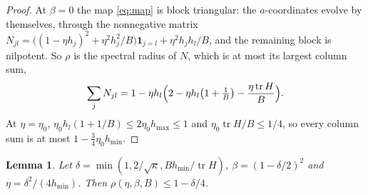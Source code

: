 \documentclass[11pt]{amsart}
\newtheorem{lemma}[theorem]{Lemma}
\theoremstyle{definition}
\theoremstyle{remark}
\numberwithin{equation}{section}
\newcommand{\tr}{\operatorname{tr}}
\newcommand{\hmax}{h_{\max}}
\newcommand{\hmin}{h_{\min}}
\begin{document}
\begin{proof}
At $\beta=0$ the map \eqref{eq:map} is block triangular: the $a$-coordinates evolve by themselves, through the nonnegative matrix $N_{jl}=\bigl((1-\eta h_j)^2+\eta^2h_j^2/B\bigr)\mathbf 1_{j=l}+\eta^2h_jh_l/B$, and the remaining block is nilpotent. So $\rho$ is the spectral radius of $N$, which is at most its largest column sum,
\[
\sum_jN_{jl}=1-\eta h_l\Bigl(2-\eta h_l\bigl(1+\tfrac1B\bigr)-\frac{\eta\tr H}{B}\Bigr).
\]
At $\eta=\eta_0$, $\eta_0h_l(1+1/B)\le2\eta_0\hmax\le1$ and $\eta_0\tr H/B\le1/4$, so every column sum is at most $1-\frac34\eta_0\hmin$.
\end{proof}

\begin{lemma}\label{lem:tuning}
Let $\delta=\min(1,2/\sqrt\kappa,B\hmin/\tr H)$, $\beta=(1-\delta/2)^2$ and $\eta=\delta^2/(4\hmin)$. Then $\rho(\eta,\beta,B)\le1-\delta/4$.
\end{lemma}
\end{document}
